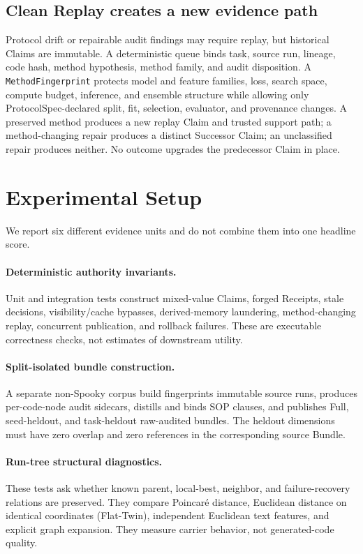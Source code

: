 \documentclass{article}
\begin{document}
\subsection{Clean Replay creates a new evidence path}

Protocol drift or repairable audit findings may require replay, but historical
Claims are immutable.  A deterministic queue binds task, source run, lineage,
code hash, method hypothesis, method family, and audit disposition.  A
\texttt{MethodFingerprint} protects model and feature families, loss, search
space, compute budget, inference, and ensemble structure while allowing only
ProtocolSpec-declared split, fit, selection, evaluator, and provenance changes.
A preserved method produces a new replay Claim and trusted support path; a
method-changing repair produces a distinct Successor Claim; an unclassified
repair produces neither.  No outcome upgrades the predecessor Claim in place.

\section{Experimental Setup}

We report six different evidence units and do not combine them into one
headline score.

\paragraph{Deterministic authority invariants.}
Unit and integration tests construct mixed-value Claims, forged Receipts,
stale decisions, visibility/cache bypasses, derived-memory laundering,
method-changing replay, concurrent publication, and rollback failures.  These
are executable correctness checks, not estimates of downstream utility.

\paragraph{Split-isolated bundle construction.}
A separate non-Spooky corpus build fingerprints immutable source runs, produces
per-code-node audit sidecars, distills and binds SOP clauses, and publishes Full,
seed-heldout, and task-heldout raw-audited bundles.  The heldout dimensions must
have zero overlap and zero references in the corresponding source Bundle.

\paragraph{Run-tree structural diagnostics.}
These tests ask whether known parent, local-best, neighbor, and failure-recovery
relations are preserved.  They compare Poincar\'e distance, Euclidean distance
on identical coordinates (Flat-Twin), independent Euclidean text features, and
explicit graph expansion.  They measure carrier behavior, not generated-code
quality.
\end{document}
